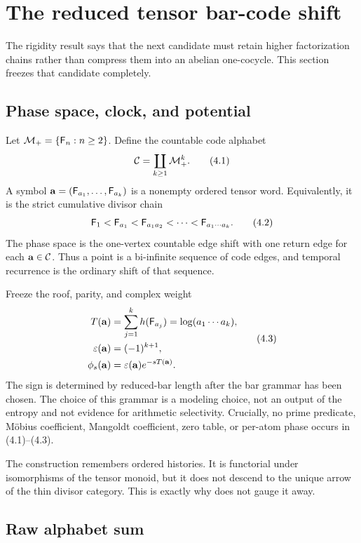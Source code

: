 \section{The reduced tensor bar-code shift}
\label{sec:bar}

The rigidity result says that the next candidate must retain higher
factorization chains rather than compress them into an abelian one-cocycle.
This section freezes that candidate completely.

\subsection{Phase space, clock, and potential}

Let $\mathcal M_+=\{\mathsf F_n:n\ge2\}$.  Define the countable code alphabet
\[
  \mathcal C=\coprod_{k\ge1}\mathcal M_+^k.
  \tag{4.1}
\]
A symbol $\mathbf a=(\mathsf F_{a_1},\ldots,\mathsf F_{a_k})$ is a nonempty ordered tensor
word.  Equivalently, it is the strict cumulative divisor chain
\[
  \mathsf F_1<\mathsf F_{a_1}<\mathsf F_{a_1a_2}<\cdots<\mathsf F_{a_1\cdots a_k}.
  \tag{4.2}
\]
The phase space is the one-vertex countable edge shift with one return edge
for each $\mathbf a\in\mathcal C$.  Thus a point is a bi-infinite sequence of code
edges, and temporal recurrence is the ordinary shift of that sequence.

Freeze the roof, parity, and complex weight
\[
\begin{split}
  T(\mathbf a)&=\sum_{j=1}^k h(\mathsf F_{a_j})
               =\log(a_1\cdots a_k),\\
  \varepsilon(\mathbf a)&=(-1)^{k+1},\\
  \phi_s(\mathbf a)&=\varepsilon(\mathbf a)e^{-sT(\mathbf a)}.
\end{split}
\tag{4.3}
\]
The sign is determined by reduced-bar length after the bar grammar has been
chosen.  The choice of this grammar is a modeling choice, not an output of
the entropy and not evidence for arithmetic selectivity.  Crucially, no
prime predicate, M\"obius coefficient, Mangoldt coefficient, zero table, or
per-atom phase occurs in (4.1)--(4.3).

The construction remembers ordered histories.  It is functorial under
isomorphisms of the tensor monoid, but it does not descend to the unique arrow
of the thin divisor category.  This is exactly why
 does not gauge it away.

\subsection{Raw alphabet sum}

